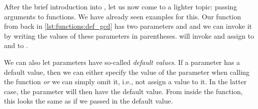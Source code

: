 %
\endhsection%
%
%
%
%
%
%
%
%
%
After the brief introduction into , let us now come to a lighter topic: passing arguments to functions.%
We have already seen examples for this.
Our  function from back in \cref{lst:functions:def_gcd} has two parameters  and  and we can invoke it by writing the values of these parameters in parentheses.
 will invoke  and assign  to  and  to .

We can also let parameters have so-called \emph{default values}.
If a parameter has a default value, then we can either specify the value of the parameter when calling the function \emph{or} we can simply omit it, i.e., not assign a value to it.
In the latter case, the parameter will then have the default value.
From inside the function, this looks the same as if we passed in the default value.

